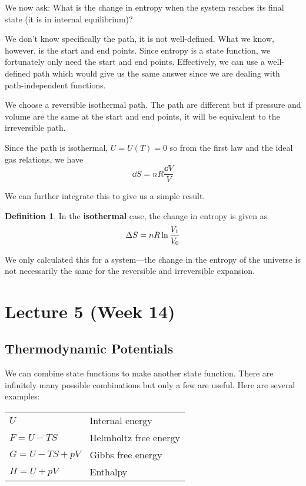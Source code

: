 \documentclass[12pt,chapterprefix=false,dvipsnames]{scrbook}
\theoremstyle{dotless}
\theoremstyle{definition}
\newtheorem{protodefinition}{Definition}[section]
\newenvironment{definition}
{\colorlet{shadecolor}{black!15}\begin{shaded}\begin{protodefinition}}
			{\end{protodefinition}\end{shaded}}
\begin{document}
We now ask: What is the change in entropy when the system
reaches its final state (it is in internal equilibrium)?

We don't know specifically the path, it is not well-defined.
What we know, however, is the start and end points. Since
entropy is a state function, we fortunately only need the start
and end points. Effectively, we can use a well-defined path
which would give us the same answer since we are dealing with
path-independent functions.

We choose a reversible isothermal path. The path are different
but if pressure and volume are the same at the start and end
points, it will be equivalent to the irreversible path.

Since the path is isothermal, $U = U(T) = 0$ so from
the first law and the ideal gas relations, we have
\begin{equation}
	\dd{S} = nR\frac{\dd{V}}{V}
\end{equation}

We can further integrate this to give us a simple result.

\begin{definition}
	In the \textbf{isothermal} case, the change in entropy is
	given as
	\begin{equation}
		\label{eq:isothermal_entropy_change}
		\Delta S = nR\naturallogarithm{\frac{V_1}{V_0}}
	\end{equation}
\end{definition}

We only calculated this for a system---the change in the entropy
of the universe is not necessarily the same for the reversible
and irreversible expansion.

\chapter{Lecture 5 (Week 14)}%
\label{cha:lecture_5}

\section{Thermodynamic Potentials}%
\label{sec:thermodynamic_potentials}

We can combine state functions to make another state function.
There are infinitely many possible combinations but only a few
are useful. Here are several examples:
\begin{center}
	\begin{tabular}{l l}
		$U$               & Internal energy       \\
		$F = U - TS$      & Helmholtz free energy \\
		$G = U - TS + pV$ & Gibbs free energy     \\
		$H = U +pV$       & Enthalpy              \\
	\end{tabular}
\end{center}
\end{document}
